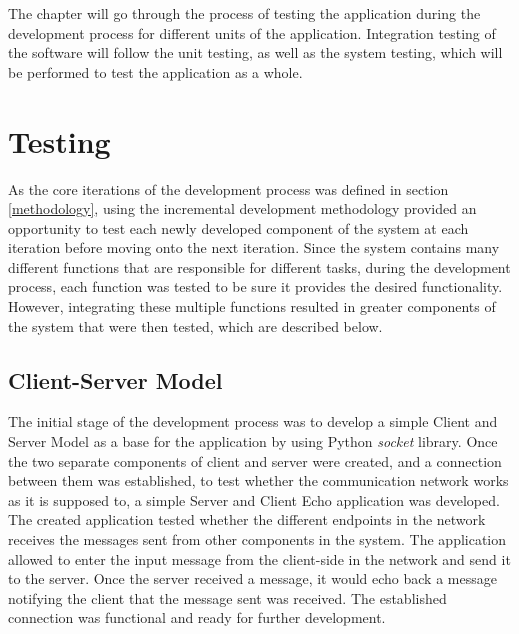 \documentclass[10pt]{report}
\begin{document}
The chapter will go through the process of testing the application during the development process for different units of the application. Integration testing of the software will follow the unit testing, as well as the system testing, which will be performed to test the application as a whole.
\newline

\section{Testing} \label{testing}

\noindent As the core iterations of the development process was defined in section \ref{methodology}, using the incremental development methodology provided an opportunity to test each newly developed component of the system at each iteration before moving onto the next iteration. Since the system contains many different functions that are responsible for different tasks, during the development process, each function was tested to be sure it provides the desired functionality. However, integrating these multiple functions resulted in greater components of the system that were then tested, which are described below.

\subsection*{Client-Server Model}
The initial stage of the development process was to develop a simple Client and Server Model as a base for the application by using Python \textit{socket} library. Once the two separate components of client and server were created, and a connection between them was established, to test whether the communication network works as it is supposed to, a simple Server and Client Echo application was developed. The created application tested whether the different endpoints in the network receives the messages sent from other components in the system. The application allowed to enter the input message from the client-side in the network and send it to the server. Once the server received a message, it would echo back a message notifying the client that the message sent was received. The established connection was functional and ready for further development.
\end{document}
